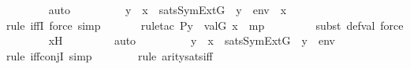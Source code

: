 \begin{isabellebody}
\ \ \ \ \ \ \isamarkupfalse%
\ auto\isanewline
\ \ \ \ \isamarkupfalse%
\ \isamarkupfalse%
\ {\isachardoublequoteopen}{\isachardot}{\kern0pt}{\isachardot}{\kern0pt}{\isachardot}{\kern0pt}\ {\isasymlongleftrightarrow}\ y\ {\isasymin}\ x\ {\isasymand}\ sats{\isacharparenleft}{\kern0pt}SymExt{\isacharparenleft}{\kern0pt}G{\isacharparenright}{\kern0pt}{\isacharcomma}{\kern0pt}\ {\isasymphi}{\isacharcomma}{\kern0pt}\ {\isacharparenleft}{\kern0pt}{\isacharbrackleft}{\kern0pt}y{\isacharbrackright}{\kern0pt}\ {\isacharat}{\kern0pt}\ env{\isacharparenright}{\kern0pt}\ {\isacharat}{\kern0pt}\ {\isacharbrackleft}{\kern0pt}x{\isacharbrackright}{\kern0pt}{\isacharparenright}{\kern0pt}{\isachardoublequoteclose}\isanewline
\ \ \ \ \ \ \isamarkupfalse%
{\isacharparenleft}{\kern0pt}rule\ iffI{\isacharcomma}{\kern0pt}\ force{\isacharcomma}{\kern0pt}\ simp{\isacharparenright}{\kern0pt}\isanewline
\ \ \ \ \ \ \isamarkupfalse%
{\isacharparenleft}{\kern0pt}rule{\isacharunderscore}{\kern0pt}tac\ P{\isacharequal}{\kern0pt}{\isachardoublequoteopen}y\ {\isasymin}\ val{\isacharparenleft}{\kern0pt}G{\isacharcomma}{\kern0pt}\ x{\isacharprime}{\kern0pt}{\isacharparenright}{\kern0pt}{\isachardoublequoteclose}\ \ mp{\isacharparenright}{\kern0pt}\ \isanewline
\ \ \ \ \ \ \ \isamarkupfalse%
{\isacharparenleft}{\kern0pt}subst\ def{\isacharunderscore}{\kern0pt}val{\isacharcomma}{\kern0pt}\ force{\isacharparenright}{\kern0pt}\isanewline
\ \ \ \ \ \ \isamarkupfalse%
\ x{\isacharprime}{\kern0pt}H\ \isanewline
\ \ \ \ \ \ \isamarkupfalse%
\ auto\isanewline
\ \ \ \ \isamarkupfalse%
\ \isamarkupfalse%
\ {\isachardoublequoteopen}{\isachardot}{\kern0pt}{\isachardot}{\kern0pt}{\isachardot}{\kern0pt}\ {\isasymlongleftrightarrow}\ y\ {\isasymin}\ x\ {\isasymand}\ sats{\isacharparenleft}{\kern0pt}SymExt{\isacharparenleft}{\kern0pt}G{\isacharparenright}{\kern0pt}{\isacharcomma}{\kern0pt}\ {\isasymphi}{\isacharcomma}{\kern0pt}\ {\isacharbrackleft}{\kern0pt}y{\isacharbrackright}{\kern0pt}\ {\isacharat}{\kern0pt}\ env{\isacharparenright}{\kern0pt}{\isachardoublequoteclose}\isanewline
\ \ \ \ \ \ \isamarkupfalse%
{\isacharparenleft}{\kern0pt}rule\ iff{\isacharunderscore}{\kern0pt}conjI{}{\isacharcomma}{\kern0pt}\ simp{\isacharparenright}{\kern0pt}\ \isanewline
\ \ \ \ \ \ \isamarkupfalse%
{\isacharparenleft}{\kern0pt}rule\ arity{\isacharunderscore}{\kern0pt}sats{\isacharunderscore}{\kern0pt}iff{\isacharparenright}{\kern0pt}\isanewline

\end{isabellebody}
